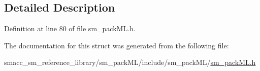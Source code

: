 \subsection{Detailed Description}


Definition at line 80 of file sm\+\_\+pack\+M\+L.\+h.



The documentation for this struct was generated from the following file\+:\begin{DoxyCompactItemize}
\item 
smacc\+\_\+sm\+\_\+reference\+\_\+library/sm\+\_\+pack\+M\+L/include/sm\+\_\+pack\+M\+L/\hyperlink{sm__packML_8h}{sm\+\_\+pack\+M\+L.\+h}\end{DoxyCompactItemize}
